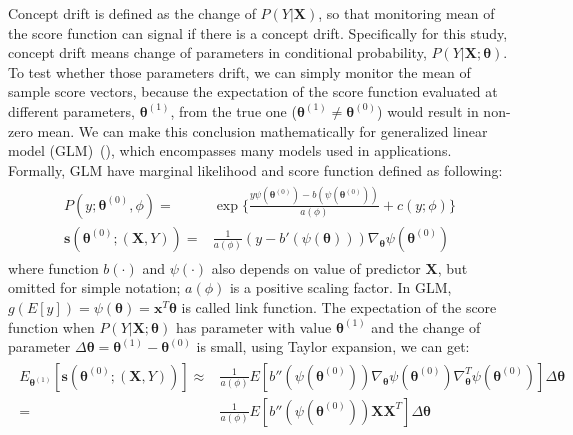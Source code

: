\documentclass[twoside,11pt]{article}
\begin{document}
Concept drift is defined as the change of $ P (Y|\bm {X})$, so that monitoring mean of the score function can signal if there is a concept drift. Specifically for this study, concept drift means change of parameters in conditional probability, $P(Y|\bm {X}; \bm { \theta})$. To test whether those parameters drift, we can simply monitor the mean of sample score vectors, because the expectation of the score function evaluated at different parameters, $\bm { \theta} ^{ (1)}$, from the true one ($\bm { \theta} ^{ (1)} \neq \bm { \theta} ^{ (0)}$) would result in non-zero mean. We can make this conclusion mathematically for generalized linear model (GLM)~(\cite{nelder1972generalized}), which encompasses many models used in applications. Formally, GLM have marginal likelihood and score function defined as following:
\begin{align}
\begin{aligned}
P(y;\bm { \theta} ^{(0)}, \phi) =& \exp\{\frac{y \psi(\bm { \theta} ^{(0)})-b( \psi(\bm { \theta} ^{(0)}))}{ a ( \phi)} + c(y; \phi)\} \\
\bm {s}(\bm { \theta} ^{(0)};(\bm {X}, Y)) =& \frac{1}{a( \phi)}(y - b'( \psi (\bm { \theta})))\nabla _{ \bm { \theta}} \psi(\bm { \theta} ^{(0)})
\end{aligned}
\label{eqn:score_glm}
\end{align}
where function $b(\cdot)$ and $ \psi(\cdot)$ also depends on value of predictor $\bm { X}$, but omitted for simple notation; $ a ( \phi)$ is a positive scaling factor. In GLM, $ g(E[y]) = \psi ( \bm { \theta})=\bm {x}^T\bm { \theta}$ is called link function. The expectation of the score function when $P(Y|\bm {X};\bm{\theta})$ has parameter with value $\bm { \theta} ^{(1)}$ and the change of parameter $ \Delta \bm { \theta}= \bm { \theta}^{(1)}-\bm { \theta}^{(0)}$ is small, using Taylor expansion, we can get:
\begin{align}
\begin{aligned}
E _{\bm { \theta} ^{(1)}}[\bm {s}(\bm { \theta} ^{(0)};(\bm {X}, Y))] \approx& \frac{1}{a ( \phi)}E[b''( \psi( \bm { \theta} ^{(0)}))\nabla _{ \bm { \theta}} \psi ( \bm { \theta} ^{ (0)}) \nabla _{ \bm { \theta}}^T \psi ( \bm { \theta} ^{ (0)})] \Delta \bm { \theta} \\
=& \frac{1}{a ( \phi)}E[b''( \psi( \bm { \theta} ^{(0)}))\bm {X}\bm {X}^T] \Delta \bm { \theta}
\end{aligned}
\label{eqn:exp_score_glm}
\end{align}
\end{document}
